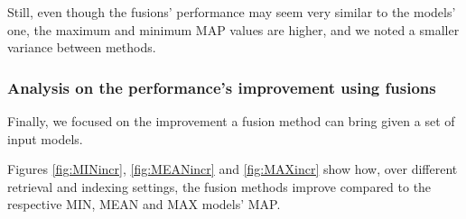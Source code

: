 	Still, even though the fusions' performance may seem very similar to the models' one, the maximum and minimum MAP values are higher, and we noted a smaller variance between methods. 

	\subsubsection{Analysis on the performance's improvement using fusions}
	
	Finally, we focused on the improvement a fusion method can bring given a set of input models.
	
	Figures \ref{fig:MINincr}, \ref{fig:MEANincr} and \ref{fig:MAXincr} show how, over different retrieval and indexing settings, the fusion methods improve compared to the respective MIN, MEAN and MAX models' MAP.
	
